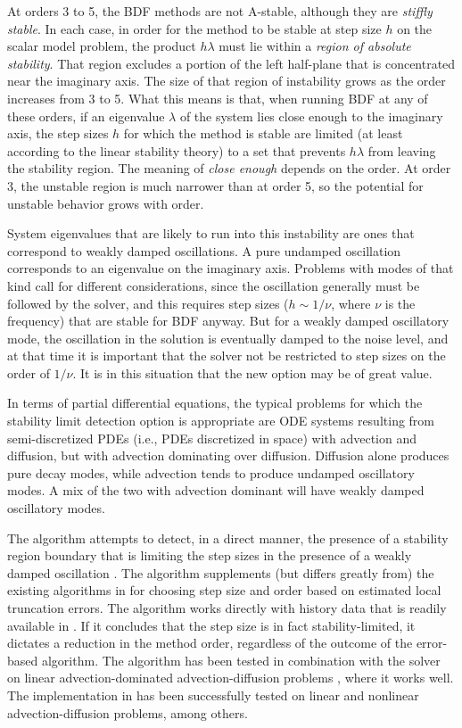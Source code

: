 At orders 3 to 5, the BDF methods are not A-stable, although they are
{\em stiffly stable}. In each case, in order for the method to be stable
at step size $h$ on the scalar model problem, the product $h\lambda$ must
lie within a {\em region of absolute stability}. 
That region excludes a portion of the left half-plane that is concentrated 
near the imaginary axis.  The size of that region of instability grows as the order
increases from 3 to 5.  What this means is that, when running BDF at
any of these orders, if an eigenvalue $\lambda$ of the system lies close
enough to the imaginary axis, the step sizes $h$ for which the method is
stable are limited (at least according to the linear stability theory)
to a set that prevents $h\lambda$ from leaving the stability region.
The meaning of {\em close enough} depends on the order.  
At order 3, the unstable region is much narrower than at order 5, 
so the potential for unstable behavior grows with order.

System eigenvalues that are likely to run into this instability are
ones that correspond to weakly damped oscillations.  A pure undamped
oscillation corresponds to an eigenvalue on the imaginary axis.
Problems with modes of that kind call for different considerations,
since the oscillation generally must be followed by the solver, and
this requires step sizes ($h \sim 1/\nu$, where $\nu$ is the frequency) 
that are stable for BDF anyway.  But for a weakly damped oscillatory mode,
the oscillation in the solution is eventually damped to the noise level, 
and at that time it is important that the solver not be restricted to step 
sizes on the order of $1/\nu$.  It is in this situation that the new option may
be of great value.

In terms of partial differential equations, the typical problems for
which the stability limit detection option is appropriate are
ODE systems resulting from semi-discretized PDEs (i.e., PDEs discretized 
in space) with advection and diffusion, but with advection dominating 
over diffusion.
Diffusion alone produces pure decay modes, while advection tends to
produce undamped oscillatory modes.  A mix of the two with advection
dominant will have weakly damped oscillatory modes.

The {\stald} algorithm attempts to detect, in a direct
manner, the presence of a stability region boundary that is limiting
the step sizes in the presence of a weakly damped oscillation \cite{Hin:92}.
The algorithm supplements (but differs greatly from) the existing
algorithms in {\cvodes} for choosing step size and order based on
estimated local truncation errors.  The {\stald} algorithm works directly
with history data that is readily available in {\cvodes}.  If it concludes
that the step size is in fact stability-limited, it dictates a
reduction in the method order, regardless of the outcome of the
error-based algorithm.  The {\stald} algorithm has been tested in
combination with the {\vode} solver on linear advection-dominated
advection-diffusion problems \cite{Hin:95}, where it works well.  The
implementation in {\cvodes} has been successfully tested on linear 
and nonlinear advection-diffusion problems, among others.

